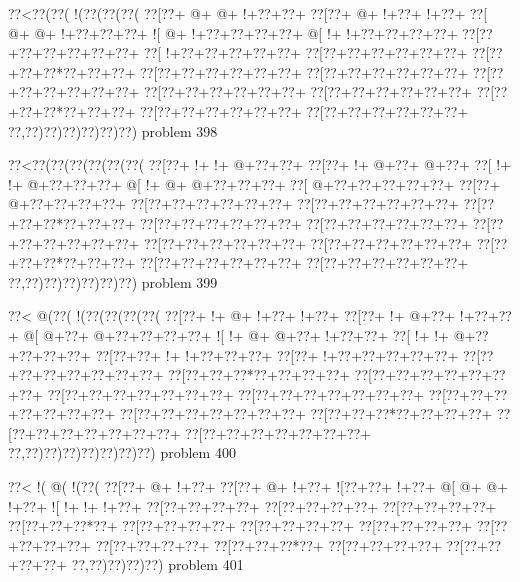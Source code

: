 \vbox{\vbox{\goo
\0??<\0??(\0??(\- !(\0??(\0??(\0??(
\0??[\0??+\- @+\- @+\- !+\0??+\0??+
\0??[\0??+\- @+\- !+\0??+\- !+\0??+
\0??[\- @+\- @+\- !+\0??+\0??+\0??+
\- ![\- @+\- !+\0??+\0??+\0??+\0??+
\- @[\- !+\- !+\0??+\0??+\0??+\0??+
\0??[\0??+\0??+\0??+\0??+\0??+\0??+
\0??[\- !+\0??+\0??+\0??+\0??+\0??+
\0??[\0??+\0??+\0??+\0??+\0??+\0??+
\0??[\0??+\0??+\0??*\0??+\0??+\0??+
\0??[\0??+\0??+\0??+\0??+\0??+\0??+
\0??[\0??+\0??+\0??+\0??+\0??+\0??+
\0??[\0??+\0??+\0??+\0??+\0??+\0??+
\0??[\0??+\0??+\0??+\0??+\0??+\0??+
\0??[\0??+\0??+\0??+\0??+\0??+\0??+
\0??[\0??+\0??+\0??*\0??+\0??+\0??+
\0??[\0??+\0??+\0??+\0??+\0??+\0??+
\0??[\0??+\0??+\0??+\0??+\0??+\0??+
\0??,\0??)\0??)\0??)\0??)\0??)\0??)
}
\hfil problem 398\hfil\break
}

\vbox{\vbox{\goo
\0??<\0??(\0??(\0??(\0??(\0??(\0??(
\0??[\0??+\- !+\- !+\- @+\0??+\0??+
\0??[\0??+\- !+\- @+\0??+\- @+\0??+
\0??[\- !+\- !+\- @+\0??+\0??+\0??+
\- @[\- !+\- @+\- @+\0??+\0??+\0??+
\0??[\- @+\0??+\0??+\0??+\0??+\0??+
\0??[\0??+\- @+\0??+\0??+\0??+\0??+
\0??[\0??+\0??+\0??+\0??+\0??+\0??+
\0??[\0??+\0??+\0??+\0??+\0??+\0??+
\0??[\0??+\0??+\0??*\0??+\0??+\0??+
\0??[\0??+\0??+\0??+\0??+\0??+\0??+
\0??[\0??+\0??+\0??+\0??+\0??+\0??+
\0??[\0??+\0??+\0??+\0??+\0??+\0??+
\0??[\0??+\0??+\0??+\0??+\0??+\0??+
\0??[\0??+\0??+\0??+\0??+\0??+\0??+
\0??[\0??+\0??+\0??*\0??+\0??+\0??+
\0??[\0??+\0??+\0??+\0??+\0??+\0??+
\0??[\0??+\0??+\0??+\0??+\0??+\0??+
\0??,\0??)\0??)\0??)\0??)\0??)\0??)
}
\hfil problem 399\hfil\break
}

\vbox{\vbox{\goo
\0??<\- @(\0??(\- !(\0??(\0??(\0??(\0??(
\0??[\0??+\- !+\- @+\- !+\0??+\- !+\0??+
\0??[\0??+\- !+\- @+\0??+\- !+\0??+\0??+
\- @[\- @+\0??+\- @+\0??+\0??+\0??+\0??+
\- ![\- !+\- @+\- @+\0??+\- !+\0??+\0??+
\0??[\- !+\- !+\- @+\0??+\0??+\0??+\0??+
\0??[\0??+\0??+\- !+\- !+\0??+\0??+\0??+
\0??[\0??+\- !+\0??+\0??+\0??+\0??+\0??+
\0??[\0??+\0??+\0??+\0??+\0??+\0??+\0??+
\0??[\0??+\0??+\0??*\0??+\0??+\0??+\0??+
\0??[\0??+\0??+\0??+\0??+\0??+\0??+\0??+
\0??[\0??+\0??+\0??+\0??+\0??+\0??+\0??+
\0??[\0??+\0??+\0??+\0??+\0??+\0??+\0??+
\0??[\0??+\0??+\0??+\0??+\0??+\0??+\0??+
\0??[\0??+\0??+\0??+\0??+\0??+\0??+\0??+
\0??[\0??+\0??+\0??*\0??+\0??+\0??+\0??+
\0??[\0??+\0??+\0??+\0??+\0??+\0??+\0??+
\0??[\0??+\0??+\0??+\0??+\0??+\0??+\0??+
\0??,\0??)\0??)\0??)\0??)\0??)\0??)\0??)
}
\hfil problem 400\hfil\break
}

\vbox{\vbox{\goo
\0??<\- !(\- @(\- !(\0??(
\0??[\0??+\- @+\- !+\0??+
\0??[\0??+\- @+\- !+\0??+
\- ![\0??+\0??+\- !+\0??+
\- @[\- @+\- @+\- !+\0??+
\- ![\- !+\- !+\- !+\0??+
\0??[\0??+\0??+\0??+\0??+
\0??[\0??+\0??+\0??+\0??+
\0??[\0??+\0??+\0??+\0??+
\0??[\0??+\0??+\0??*\0??+
\0??[\0??+\0??+\0??+\0??+
\0??[\0??+\0??+\0??+\0??+
\0??[\0??+\0??+\0??+\0??+
\0??[\0??+\0??+\0??+\0??+
\0??[\0??+\0??+\0??+\0??+
\0??[\0??+\0??+\0??*\0??+
\0??[\0??+\0??+\0??+\0??+
\0??[\0??+\0??+\0??+\0??+
\0??,\0??)\0??)\0??)\0??)
}
\hfil problem 401\hfil\break
}

